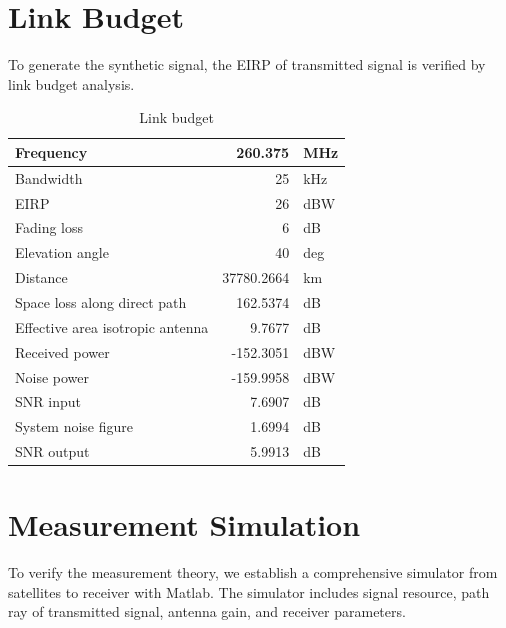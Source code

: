 \section{Link Budget}

To generate the synthetic signal, the EIRP of transmitted signal is verified by link budget analysis.
\begin{table}[]
\centering
\caption{Link budget}
\label{table: link_budget}
\begin{tabular}{lrl}
\hline
Frequency                        & 260.375    & MHz \\ \hline
Bandwidth                        & 25         & kHz \\ \hline
EIRP                             & 26         & dBW \\ \hline
Fading loss                      & 6          & dB  \\ \hline
Elevation angle                  & 40         & deg \\ \hline
Distance                         & 37780.2664 & km  \\ \hline
Space loss along direct path     & 162.5374   & dB  \\ \hline
Effective area isotropic antenna & 9.7677     & dB  \\ \hline
Received power                   & -152.3051  & dBW \\ \hline
Noise power                      & -159.9958  & dBW \\ \hline
SNR input                        & 7.6907     & dB  \\ \hline
System noise figure              & 1.6994     & dB  \\ \hline
SNR output                       & 5.9913     & dB  \\ \hline
\end{tabular}
\end{table}

\section{Measurement Simulation}

To verify the measurement theory, we establish a comprehensive simulator from  satellites to receiver with Matlab. The simulator includes signal resource, path ray of transmitted signal, antenna gain, and receiver parameters.

